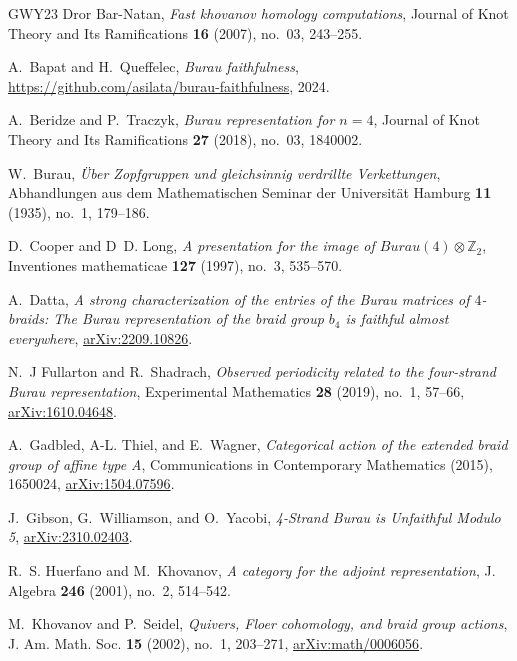 \documentclass[a4paper]{amsart}
\newcommand{\0}{\mathbf{0}}
\theoremstyle{theorem}
\begin{document}
\begin{thebibliography}{GWY23}
Dror Bar-Natan, \emph{Fast khovanov homology computations}, Journal of Knot
  Theory and Its Ramifications \textbf{16} (2007), no.~03, 243--255.

A.~Bapat and H.~Queffelec, \emph{Burau faithfulness},
  \url{https://github.com/asilata/burau-faithfulness}, 2024.

A.~Beridze and P.~Traczyk, \emph{Burau representation for $n= 4$}, Journal of
  Knot Theory and Its Ramifications \textbf{27} (2018), no.~03, 1840002.

W.~Burau, \emph{{\"U}ber {Z}opfgruppen und gleichsinnig verdrillte
  {V}erkettungen}, Abhandlungen aus dem Mathematischen Seminar der
  Universit{\"a}t Hamburg \textbf{11} (1935), no.~1, 179--186.

D.~Cooper and D~D. Long, \emph{A presentation for the image of
  {$Burau(4)\otimes \mathbb{Z}_2$}}, Inventiones mathematicae \textbf{127}
  (1997), no.~3, 535--570.

A.~Datta, \emph{A strong characterization of the entries of the {B}urau
  matrices of $4 $-braids: The {B}urau representation of the braid group $b_4 $
  is faithful almost everywhere},
  \href{https://arxiv.org/abs/2209.10826}{arXiv:2209.10826}.

N.~J Fullarton and R.~Shadrach, \emph{Observed periodicity related to the
  four-strand {B}urau representation}, Experimental Mathematics \textbf{28}
  (2019), no.~1, 57--66,
  \href{https://arxiv.org/abs/1610.04648}{arXiv:1610.04648}.

A.~Gadbled, A-L. Thiel, and E.~Wagner, \emph{Categorical action of the extended
  braid group of affine type {A}}, Communications in Contemporary Mathematics
  (2015), 1650024, \href{https://arxiv.org/abs/1504.07596}{arXiv:1504.07596}.

J.~Gibson, G.~Williamson, and O.~Yacobi, \emph{{4-Strand {B}urau is Unfaithful
  Modulo 5}}, \href{https://arxiv.org/abs/2310.02403}{arXiv:2310.02403}.

R.~S. Huerfano and M.~Khovanov, \emph{A category for the adjoint
  representation}, J. Algebra \textbf{246} (2001), no.~2, 514--542.

M.~Khovanov and P.~Seidel, \emph{{Quivers, Floer cohomology, and braid group
  actions}}, J. Am. Math. Soc. \textbf{15} (2002), no.~1, 203--271,
  \href{https://arxiv.org/abs/math/0006056}{arXiv:math/0006056}.


\end{thebibliography}
\end{document}
